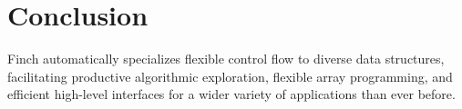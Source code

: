 \section{Conclusion}
Finch automatically specializes flexible control flow to diverse data structures,
facilitating productive algorithmic exploration, flexible array programming, and
efficient high-level interfaces for a wider variety of applications than ever before.